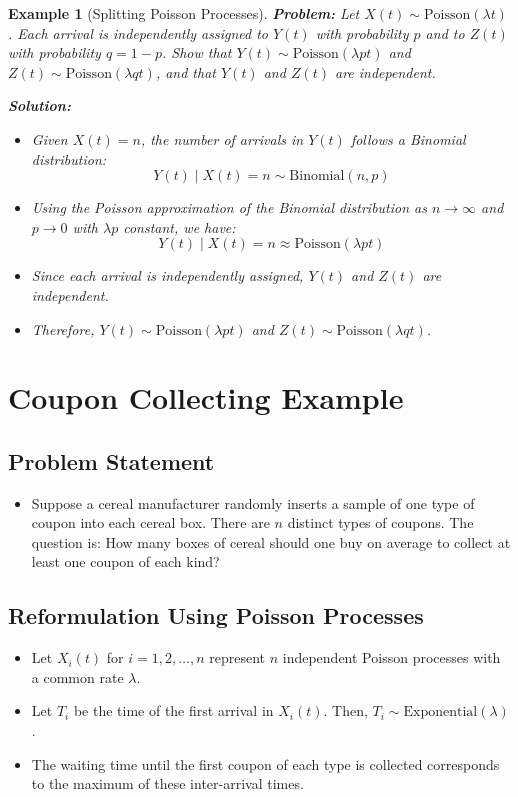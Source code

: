 \documentclass[12pt]{article}
\newtheorem{example}{Example}
\begin{document}
\begin{example}[Splitting Poisson Processes]
    \textbf{Problem:} Let \( X(t) \sim \text{Poisson}(\lambda t) \). Each arrival is independently assigned to \( Y(t) \) with probability \( p \) and to \( Z(t) \) with probability \( q = 1 - p \). Show that \( Y(t) \sim \text{Poisson}(\lambda p t) \) and \( Z(t) \sim \text{Poisson}(\lambda q t) \), and that \( Y(t) \) and \( Z(t) \) are independent.
    
    \textbf{Solution:}
    \begin{itemize}
        \item Given \( X(t) = n \), the number of arrivals in \( Y(t) \) follows a Binomial distribution:
        \[
        Y(t) \mid X(t) = n \sim \text{Binomial}(n, p)
        \]
        \item Using the Poisson approximation of the Binomial distribution as \( n \to \infty \) and \( p \to 0 \) with \( \lambda p \) constant, we have:
        \[
        Y(t) \mid X(t) = n \approx \text{Poisson}(\lambda p t)
        \]
        \item Since each arrival is independently assigned, \( Y(t) \) and \( Z(t) \) are independent.
        \item Therefore, \( Y(t) \sim \text{Poisson}(\lambda p t) \) and \( Z(t) \sim \text{Poisson}(\lambda q t) \).
    \end{itemize}
\end{example}

\section{Coupon Collecting Example}

\subsection{Problem Statement}
\begin{itemize}
    \item Suppose a cereal manufacturer randomly inserts a sample of one type of coupon into each cereal box. There are \( n \) distinct types of coupons. The question is: How many boxes of cereal should one buy on average to collect at least one coupon of each kind?
\end{itemize}

\subsection{Reformulation Using Poisson Processes}
\begin{itemize}
    \item Let \( X_i(t) \) for \( i = 1, 2, \ldots, n \) represent \( n \) independent Poisson processes with a common rate \( \lambda \).
    \item Let \( T_i \) be the time of the first arrival in \( X_i(t) \). Then, \( T_i \sim \text{Exponential}(\lambda) \).
    \item The waiting time until the first coupon of each type is collected corresponds to the maximum of these inter-arrival times.
\end{itemize}
\end{document}
